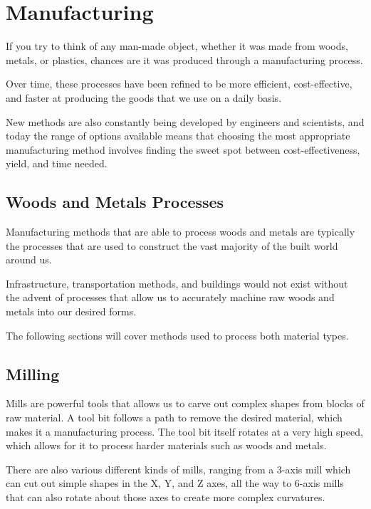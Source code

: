 \chapter{Manufacturing}

If you try to think of any man-made object, whether it was made from woods, metals, or plastics, chances are it was produced through a manufacturing process.

Over time, these processes have been refined to be more efficient, cost-effective, and faster at producing the goods that we use on a daily basis.

New methods are also constantly being developed by engineers and scientists, and today the range of options available means that choosing the most appropriate manufacturing method involves finding the sweet spot between cost-effectiveness, yield, and time needed.

\section{Woods and Metals Processes}

Manufacturing methods that are able to process woods and metals are typically the processes that are used to construct the vast majority of the built world around us. 

Infrastructure, transportation methods, and buildings would not exist without the advent of processes that allow us to accurately machine raw woods and metals into our desired forms.

The following sections will cover methods used to process both material types.

\section{Milling}

Mills are powerful tools that allows us to carve out complex shapes from blocks of raw material. A tool bit follows a path to remove the desired material, which makes it a  manufacturing process. The tool bit itself rotates at a very high speed, which allows for it to process harder materials such as woods and metals.


There are also various different kinds of mills, ranging from a 3-axis mill which can cut out simple shapes in the X, Y, and Z axes, all the way to 6-axis mills that can also rotate about those axes to create more complex curvatures.

